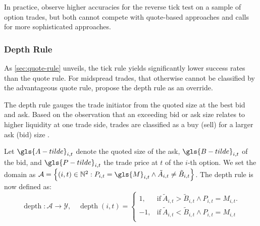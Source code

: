 In practice, \textcite[][29--32]{grauerOptionTradeClassification2022} observe higher accuracies for the reverse tick test on a sample of option trades, but both cannot compete with quote-based approaches and calls for more sophisticated approaches.

\subsubsection{Depth Rule}\label{sec:depth-rule}


As \cref{sec:quote-rule} unveils, the tick rule yields significantly lower success rates than the quote rule. For midspread trades, that otherwise cannot be classified by the advantageous quote rule, \textcite[][14]{grauerOptionTradeClassification2022} propose the depth rule as an override.

The depth rule gauges the trade initiator from the quoted size at the best bid and ask. Based on the observation that an exceeding bid or ask size relates to higher liquidity at one trade side, trades are classified as a buy (sell) for a larger ask (bid) size \autocite[][14]{grauerOptionTradeClassification2022}.

Let $\gls{A-tilde}_{i,t}$ denote the quoted size of the ask, $\gls{B-tilde}_{i,t}$ of the bid, and $\gls{P-tilde}_{i,t}$ the trade price at $t$ of the $i$-th option. We set the domain as $\mathcal{A} = \left\{(i, t) \in \mathbb{N}^2: P_{i,t} = \gls{M}_{i,t} \land \tilde{A}_{i,t} \neq \tilde{B}_{i,t} \right\}$. The depth rule is now defined as:
\begin{equation}
    \operatorname{depth} \colon \mathcal{A} \to \mathcal{Y},\quad
    \operatorname{depth}(i, t)=
    \begin{cases}
        1,  & \text{if}\ \tilde{A}_{i,t} > \tilde{B}_{i,t} \land P_{i, t} = M_{i, t}. \\
        -1, & \text{if}\ \tilde{A}_{i,t} < \tilde{B}_{i,t} \land P_{i, t} = M_{i, t}  \\
    \end{cases}
    \label{eq:depth-rule}
\end{equation}

